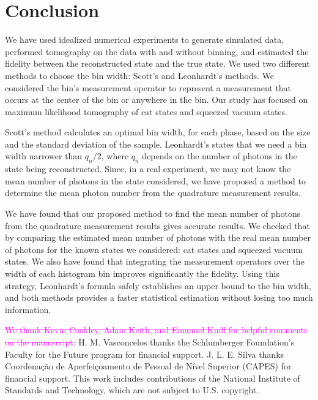 \documentclass[
reprint,
superscriptaddress,
showpacs,
amsmath,
amssymb,
aps,
pra,
longbibliography
]{revtex4-1}
\providecommand{\aucmnt}[1]{#1}
\providecommand{\editcolor}[2]{\textcolor{#1}{#2}}
\providecommand{\aucmnt}[1]{}
\providecommand{\editcolor}[2]{#2}
\newcommand{\SGs}[1]{\aucmnt{\editcolor{magenta}{\sout{#1}}}}
\begin{document}
\section{Conclusion}
\label{conclusion}

We have used idealized numerical experiments to generate simulated
data, performed tomography on the data with and without binning, and estimated the fidelity between the reconstructed state and the true state. We used two different
methods to choose the bin width: Scott's and Leonhardt's methods. We considered the bin’s measurement operator to represent a measurement that occurs at the center of the bin or anywhere in the bin. Our study has focused on maximum likelihood tomography of cat states and squeezed vacuum states. 

Scott's method calculates an optimal bin width, for each phase, based on the size and
the standard deviation of the sample. Leonhardt's states that we need a bin width
narrower than $q_n/2$, where $q_n$ depends on the number of photons in the state
being reconstructed. Since, in a real experiment, we may not know the mean number
of photons in the state considered, we have proposed a method to determine the 
mean photon number from the quadrature measurement results.    

We have found that our proposed method to find the mean number of photons from the quadrature measurement results gives accurate results. We checked that by comparing
the estimated mean number of photons with the real mean number of photons for the
known states we considered: cat states and squeezed vacuum states. We also have found that integrating the measurement operators over the width of each histogram bin improves significantly the fidelity. Using this strategy, Leonhardt's formula safely establishes an upper bound to the bin width, and both methods provides a faster statistical estimation without losing too much information. 



\begin{acknowledgments}
\SGs{We thank Kevin Coakley, Adam Keith, and Emanuel Knill for helpful
comments on the manuscript.}  H. M. Vasconcelos thanks the Schlumberger 
Foundation's Faculty for the Future program for financial support. J. L. E. Silva thanks Coordena\c c\~ao de Aperfei\c coamento de Pessoal de N\'ivel Superior (CAPES) for financial support. This work includes contributions of the National Institute of Standards and
Technology, which are not subject to U.S. copyright.
\end{acknowledgments}
\end{document}
